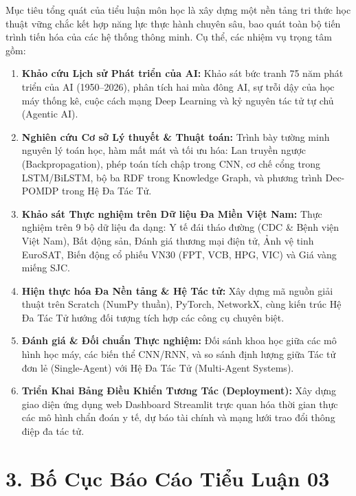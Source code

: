 \documentclass[12pt,a4paper]{report}
\begin{document}
Mục tiêu tổng quát của tiểu luận môn học là xây dựng một nền tảng tri thức học thuật vững chắc kết hợp năng lực thực hành chuyên sâu, bao quát toàn bộ tiến trình tiến hóa của các hệ thống thông minh. Cụ thể, các nhiệm vụ trọng tâm gồm:
\begin{enumerate}[leftmargin=1.2cm, label={\textbf{Nhiệm vụ \arabic*:}}]
    \item \textbf{Khảo cứu Lịch sử Phát triển của AI:} Khảo sát bức tranh 75 năm phát triển của AI (1950--2026), phân tích hai mùa đông AI, sự trỗi dậy của học máy thống kê, cuộc cách mạng Deep Learning và kỷ nguyên tác tử tự chủ (Agentic AI).
    \item \textbf{Nghiên cứu Cơ sở Lý thuyết \& Thuật toán:} Trình bày tường minh nguyên lý toán học, hàm mất mát và tối ưu hóa: Lan truyền ngược (Backpropagation), phép toán tích chập trong CNN, cơ chế cổng trong LSTM/BiLSTM, bộ ba RDF trong Knowledge Graph, và phương trình Dec-POMDP trong Hệ Đa Tác Tử.
    \item \textbf{Khảo sát Thực nghiệm trên Dữ liệu Đa Miền Việt Nam:} Thực nghiệm trên 9 bộ dữ liệu đa dạng: Y tế đái tháo đường (CDC \& Bệnh viện Việt Nam), Bất động sản, Đánh giá thương mại điện tử, Ảnh vệ tinh EuroSAT, Biến động cổ phiếu VN30 (FPT, VCB, HPG, VIC) và Giá vàng miếng SJC.
    \item \textbf{Hiện thực hóa Đa Nền tảng \& Hệ Tác tử:} Xây dựng mã nguồn giải thuật trên Scratch (NumPy thuần), PyTorch, NetworkX, cùng kiến trúc Hệ Đa Tác Tử hướng đối tượng tích hợp các công cụ chuyên biệt.
    \item \textbf{Đánh giá \& Đối chuẩn Thực nghiệm:} Đối sánh khoa học giữa các mô hình học máy, các biến thể CNN/RNN, và so sánh định lượng giữa Tác tử đơn lẻ (Single-Agent) với Hệ Đa Tác Tử (Multi-Agent Systems).
    \item \textbf{Triển Khai Bảng Điều Khiển Tương Tác (Deployment):} Xây dựng giao diện ứng dụng web Dashboard Streamlit trực quan hóa thời gian thực các mô hình chẩn đoán y tế, dự báo tài chính và mạng lưới trao đổi thông điệp đa tác tử.
\end{enumerate}

\section*{3. Bố Cục Báo Cáo Tiểu Luận 03}
\end{document}
